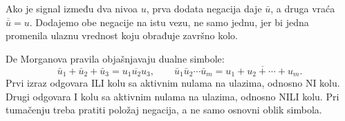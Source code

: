 Ako je signal između dva nivoa \(u\), prva dodata negacija daje \(\bar u\), a druga vraća \(\overline{\bar u}=u\). Dodajemo obe negacije na istu vezu, ne samo jednu, jer bi jedna promenila ulaznu vrednost koju obrađuje završno kolo.

De Morganova pravila objašnjavaju dualne simbole:
\[
\bar u_1+\bar u_2+\bar u_3=\overline{u_1u_2u_3},\qquad
\bar u_1\bar u_2\cdots\bar u_m=\overline{u_1+u_2+\cdots+u_m}.
\]
Prvi izraz odgovara ILI kolu sa aktivnim nulama na ulazima, odnosno NI kolu. Drugi odgovara I kolu sa aktivnim nulama na ulazima, odnosno NILI kolu. Pri tumačenju treba pratiti položaj negacija, a ne samo osnovni oblik simbola.
